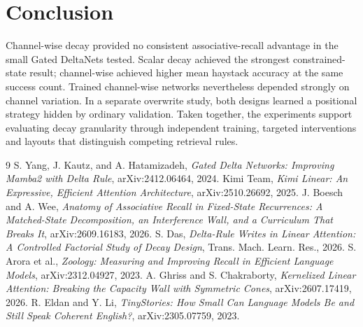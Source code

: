 \documentclass[conference]{IEEEtran}
\begin{document}
\section{Conclusion}
Channel-wise decay provided no consistent associative-recall advantage in the small Gated DeltaNets tested. Scalar decay achieved the strongest constrained-state result; channel-wise achieved higher mean haystack accuracy at the same success count. Trained channel-wise networks nevertheless depended strongly on channel variation. In a separate overwrite study, both designs learned a positional strategy hidden by ordinary validation. Taken together, the experiments support evaluating decay granularity through independent training, targeted interventions and layouts that distinguish competing retrieval rules.
\begin{thebibliography}{9}
 S. Yang, J. Kautz, and A. Hatamizadeh, \emph{Gated Delta Networks: Improving Mamba2 with Delta Rule}, arXiv:2412.06464, 2024.
 Kimi Team, \emph{Kimi Linear: An Expressive, Efficient Attention Architecture}, arXiv:2510.26692, 2025.
 J. Boesch and A. Wee, \emph{Anatomy of Associative Recall in Fixed-State Recurrences: A Matched-State Decomposition, an Interference Wall, and a Curriculum That Breaks It}, arXiv:2609.16183, 2026.
 S. Das, \emph{Delta-Rule Writes in Linear Attention: A Controlled Factorial Study of Decay Design}, Trans. Mach. Learn. Res., 2026.
 S. Arora et al., \emph{Zoology: Measuring and Improving Recall in Efficient Language Models}, arXiv:2312.04927, 2023.
 A. Ghriss and S. Chakraborty, \emph{Kernelized Linear Attention: Breaking the Capacity Wall with Symmetric Cones}, arXiv:2607.17419, 2026.
 R. Eldan and Y. Li, \emph{TinyStories: How Small Can Language Models Be and Still Speak Coherent English?}, arXiv:2305.07759, 2023.
\end{thebibliography}
\end{document}
